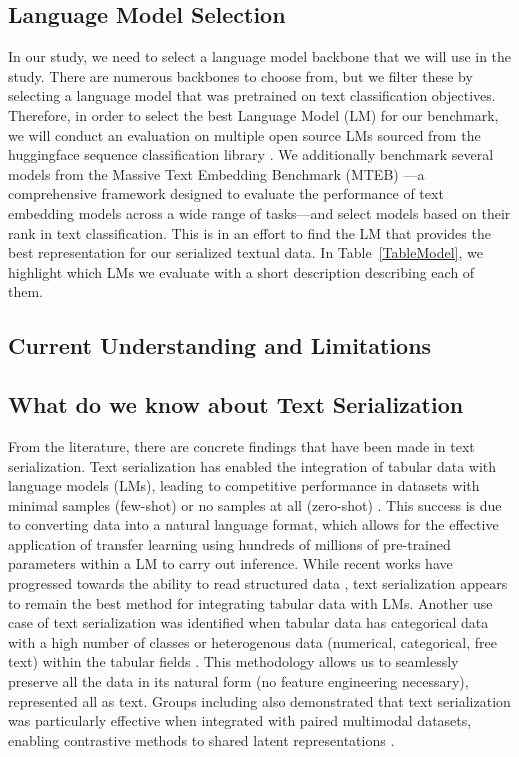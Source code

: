 \documentclass{article}
\theoremstyle{plain}
\theoremstyle{definition}
\theoremstyle{remark}
\begin{document}
\subsection{Language Model Selection}

In our study, we need to select a language model backbone that we will use in the study. There are numerous backbones to choose from, but we filter these by selecting a language model that was pretrained on text classification objectives. Therefore, in order to select the best Language Model (LM) for our benchmark, we will conduct an evaluation on multiple open source LMs sourced from the huggingface sequence classification library \citep{wolf2019huggingface}. We additionally benchmark several models from the Massive Text Embedding Benchmark (MTEB) \cite{muennighoff2022mteb}—a comprehensive framework designed to evaluate the performance of text embedding models across a wide range of tasks—and select models based on their rank in text classification. This is in an effort to find the LM that provides the best representation for our serialized textual data. In Table~\ref{TableModel}, we highlight which LMs we evaluate with a short description describing each of them. 

\subsection{Current Understanding and Limitations}
\subsection*{What do we know about Text Serialization}

From the literature, there are concrete findings that have been made in text serialization. Text serialization has enabled the integration of tabular data with language models (LMs), leading to competitive performance in datasets with minimal samples (few-shot) \cite{hegselmann2023tabllm, yang2024smalltolarge} or no samples at all (zero-shot) \cite{wei2021finetuned, kojima2022large, zhong2021adapting}. This success is due to converting data into a natural language format, which allows for the effective application of transfer learning using hundreds of millions of pre-trained parameters within a LM to carry out inference. While recent works have progressed towards the ability to read structured data \cite{song2023restgpt, chen2024beyond, yao2023sai}, text serialization appears to remain the best method for integrating tabular data with LMs. Another use case of text serialization was identified when tabular data has categorical data with a high number of classes or heterogenous data (numerical, categorical, free text) within the tabular fields \cite{lee2024multimodal}. This methodology allows us to seamlessly preserve all the data in its natural form (no feature engineering necessary), represented all as text. Groups including \cite{belyaeva2023multimodal, chen2024multimodal} also demonstrated that text serialization was particularly effective when integrated with paired multimodal datasets, enabling contrastive methods to shared latent representations \cite{radford2021learning}.
\end{document}
